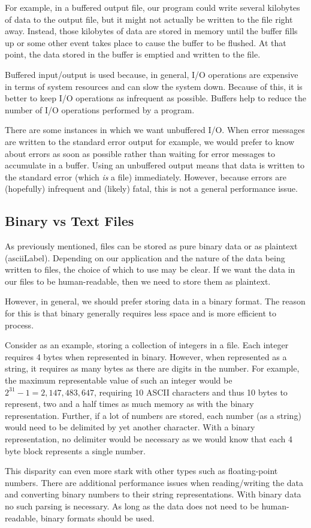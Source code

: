 For example, in a buffered output file, our program could
write several kilobytes of data to the output file, but it
might not actually be written to the file right away.  Instead,
those kilobytes of data are stored in memory until the
buffer fills up or some other event takes place to cause the
buffer to be flushed.  At that point, the data stored in the
buffer is emptied and written to the file.

Buffered input/output is used because, in general, I/O operations
are expensive in terms of system resources and can slow the system
down.  Because of this, it is better to keep I/O operations
as infrequent as possible.  Buffers help to reduce the number
of I/O operations performed by a program.  

There are some instances in which we want unbuffered I/O.
When error messages are written to the standard error output
for example, we would prefer to know about errors as soon 
as possible rather than waiting for error messages to accumulate
in a buffer.  Using an unbuffered output means that data
is written to the standard error (which \emph{is} a file) 
immediately.  However, because errors are (hopefully) infrequent
and (likely) fatal, this is not a general performance issue.

\subsection{Binary vs Text Files}

As previously mentioned, files can be stored as pure binary
data or as plaintext (\gls{asciiLabel}).  Depending on our
application and the nature of the data being written to files, 
the choice of which to use may be clear.  If we want the
data in our files to be human-readable, then we need
to store them as plaintext.  

However, in general, we should prefer storing data in a 
binary format.  The reason for this is that binary generally
requires less space and is more efficient to process.

Consider as an example, storing a collection of integers
in a file.  Each integer requires 4 bytes when represented
in binary.  However, when represented as a string, it
requires as many bytes as there are digits in the number.
For example, the maximum representable value of such an
integer would be $2^{31}-1 = 2,147,483,647$, requiring
10 ASCII characters and thus 10 bytes to represent, two
and a half times as much memory as with the binary 
representation.  Further, if a lot of numbers are stored, 
each number (as a string) would need to be delimited by
yet another character.  With a binary representation, 
no delimiter would be necessary as we would know that 
each 4 byte block represents a single number.

This disparity can even more stark with other types 
such as floating-point numbers.  There are additional
performance issues when reading/writing the data and
converting binary numbers to their string representations.
With binary data no such parsing is necessary. As long 
as the data does not need to be human-readable, binary
formats should be used.

